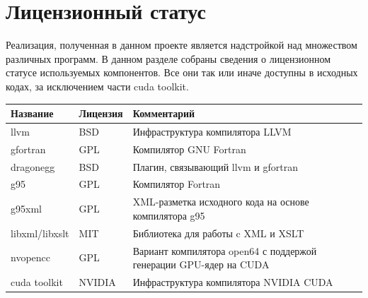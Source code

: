 \documentclass[a4,12pt]{report}
\begin{document}

\chapter{Лицензионный статус}

Реализация, полученная в данном проекте является надстройкой над множеством различных программ. В данном разделе собраны сведения о лицензионном статусе используемых компонентов. Все они так или иначе доступны в исходных кодах, за исключением части cuda toolkit.

\vspace{15pt}
\begin{tabular}[h]{|l|l|p{9cm}|}
\hline
Название & Лицензия & Комментарий \\ \hline \hline
llvm & BSD & Инфраструктура компилятора LLVM \\ \hline
gfortran & GPL & Компилятор GNU Fortran \\ \hline
dragonegg & BSD & Плагин, связывающий llvm и gfortran \\ \hline
g95 & GPL & Компилятор Fortran \\ \hline
g95xml & GPL & XML-разметка исходного кода на основе компилятора g95 \\ \hline
libxml/libxslt & MIT & Библиотека для работы c XML и XSLT \\ \hline
nvopencc & GPL & Вариант компилятора open64 с поддержой генерации GPU-ядер на CUDA \\ \hline
cuda toolkit & NVIDIA & Инфраструктура компилятора NVIDIA CUDA \\ \hline
\end{tabular}
\end{document}
